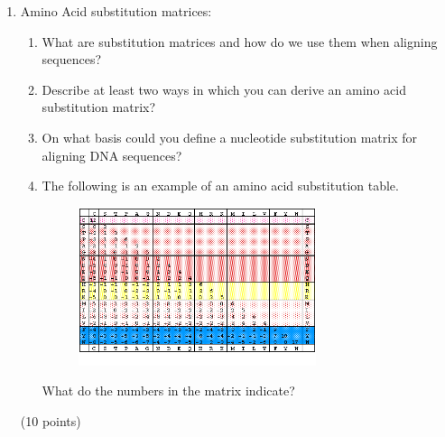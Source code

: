 \documentclass[11pt]{article}
\begin{document}
\begin{enumerate}


\item Amino Acid substitution matrices:
  \begin{enumerate}
  \item What are substitution matrices and how do we use them when aligning
    sequences?
  \item Describe at least two ways in which you can derive an amino acid
    substitution matrix?
  \item On what basis could you define a nucleotide substitution matrix for
    aligning DNA sequences?
  \item The following is an example of an amino acid substitution table.
    \begin{figure}[H]
      \includegraphics[width=0.7\textwidth]{images/dayhoff_256}
    \end{figure}
    What do the numbers in the matrix indicate?
  \end{enumerate}
(10 points)
\end{enumerate}
\end{document}
